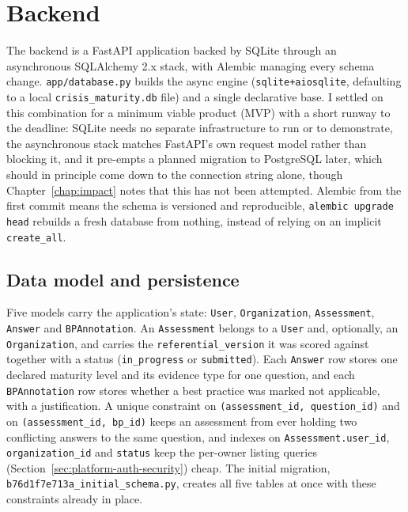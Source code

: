 \section{Backend}
\label{sec:platform-backend}

The backend is a FastAPI application backed by SQLite through an asynchronous SQLAlchemy 2.x stack, with Alembic managing every schema change. \texttt{app/\allowbreak database.\allowbreak py} builds the async engine (\texttt{sqlite+aiosqlite}, defaulting to a local \texttt{crisis\_\allowbreak maturity.\allowbreak db} file) and a single declarative base. I settled on this combination for a minimum viable product (MVP) with a short runway to the deadline: SQLite needs no separate infrastructure to run or to demonstrate, the asynchronous stack matches FastAPI's own request model rather than blocking it, and it pre-empts a planned migration to PostgreSQL later, which should in principle come down to the connection string alone, though Chapter~\ref{chap:impact} notes that this has not been attempted. Alembic from the first commit means the schema is versioned and reproducible, \texttt{alembic upgrade head} rebuilds a fresh database from nothing, instead of relying on an implicit \texttt{create\_\allowbreak all}.

\subsection{Data model and persistence}

Five models carry the application's state: \texttt{User}, \texttt{Organization}, \texttt{Assessment}, \texttt{Answer} and \texttt{BPAnnotation}. An \texttt{Assessment} belongs to a \texttt{User} and, optionally, an \texttt{Organization}, and carries the \texttt{referential\_\allowbreak version} it was scored against together with a status (\texttt{in\_\allowbreak progress} or \texttt{submitted}). Each \texttt{Answer} row stores one declared maturity level and its evidence type for one question, and each \texttt{BPAnnotation} row stores whether a best practice was marked not applicable, with a justification. A unique constraint on \texttt{(assessment\_\allowbreak id, question\_\allowbreak id)} and on \texttt{(assessment\_\allowbreak id, bp\_\allowbreak id)} keeps an assessment from ever holding two conflicting answers to the same question, and indexes on \texttt{Assessment.\allowbreak user\_\allowbreak id}, \texttt{organization\_\allowbreak id} and \texttt{status} keep the per-owner listing queries (Section~\ref{sec:platform-auth-security}) cheap. The initial migration, \texttt{b76d1f7e713a\_\allowbreak initial\_\allowbreak schema.\allowbreak py}, creates all five tables at once with these constraints already in place.

